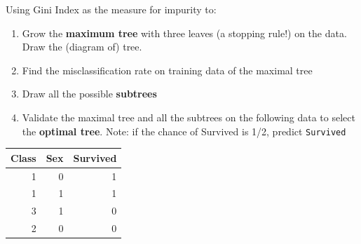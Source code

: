 \documentclass[
]{article}
\providecommand{\tightlist}{%
  \setlength{\itemsep}{0pt}\setlength{\parskip}{0pt}}
\begin{document}
Using Gini Index as the measure for impurity to:

\begin{enumerate}
\def\labelenumi{\arabic{enumi}.}
\tightlist
\item
  Grow the \textbf{maximum tree} with three leaves (a stopping rule!) on
  the data. Draw the (diagram of) tree.
\item
  Find the misclassification rate on training data of the maximal tree
\item
  Draw all the possible \textbf{subtrees}
\item
  Validate the maximal tree and all the subtrees on the following data
  to select the \textbf{optimal tree}. Note: if the chance of Survived
  is 1/2, predict \texttt{Survived}
\end{enumerate}

\begin{longtable}[]{@{}rrr@{}}
\toprule
Class & Sex & Survived\tabularnewline
\midrule
\endhead
1 & 0 & 1\tabularnewline
1 & 1 & 1\tabularnewline
3 & 1 & 0\tabularnewline
2 & 0 & 0\tabularnewline
\bottomrule
\end{longtable}
\end{document}
